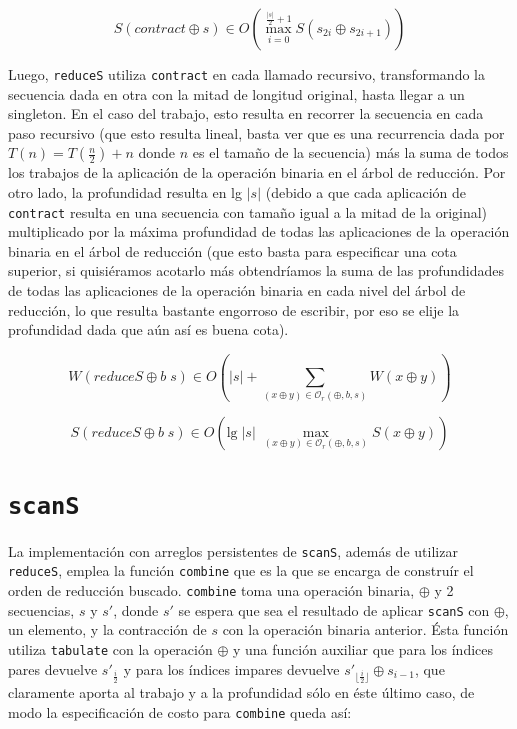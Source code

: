 \documentclass[a4paper,10pt]{article}
\begin{document}
\begin{equation*}
    S \left( contract \oplus s \right) \in
    O \left( \max_{i=0}^{\frac{\vert s \vert}{2} + 1} S \left( s_{2i} \oplus s_{2i+1} \right) \right)
\end{equation*}

Luego, \texttt{reduceS} utiliza \texttt{contract} en cada llamado recursivo,
transformando la secuencia dada en otra con la mitad de longitud original, hasta
llegar a un singleton. En el caso del trabajo, esto resulta en recorrer la secuencia
en cada paso recursivo (que esto resulta lineal, basta ver que es una recurrencia
dada por $T \left( n \right) = T \left( \frac{n}{2} \right) + n$ donde $n$ es el
tamaño de la secuencia) más la suma de todos los trabajos de la aplicación de la
operación binaria en el árbol de reducción. Por otro lado, la profundidad resulta
en lg $\vert s \vert$ (debido a que cada aplicación de \texttt{contract} resulta
en una secuencia con tamaño igual a la mitad de la original) multiplicado por la
máxima profundidad de todas las aplicaciones de la operación binaria en el árbol
de reducción (que esto basta para especificar una cota superior, si quisiéramos
acotarlo más obtendríamos la suma de las profundidades de todas las aplicaciones
de la operación binaria en cada nivel del árbol de reducción, lo que resulta
bastante engorroso de escribir, por eso se elije la profundidad dada que aún así
es buena cota).

\begin{equation*}
    W \left( reduceS \oplus b \; s \right) \in
    O \left( \vert s \vert + \sum_{(x \oplus y) \in \mathcal{O}_r(\oplus,b,s)} W \left( x \oplus y \right) \right)
\end{equation*}

\begin{equation*}
    S \left( reduceS \oplus b \; s \right) \in
    O \left( \text{lg} \; \vert s \vert \; \max_{(x \oplus y) \in \mathcal{O}_r(\oplus,b,s)} S \left( x \oplus y \right) \right)
\end{equation*}

\section*{\texttt{scanS}}

La implementación con arreglos persistentes de \texttt{scanS}, además de utilizar
\texttt{reduceS}, emplea la función \texttt{combine} que es la que se encarga de
construír el orden de reducción buscado.
\texttt{combine} toma una operación binaria, $\oplus$ y 2 secuencias, $s$ y $s'$,
donde $s'$ se espera que sea el resultado de aplicar \texttt{scanS} con $\oplus$,
un elemento, y la contracción de $s$ con la operación binaria anterior. Ésta función
utiliza \texttt{tabulate} con la operación $\oplus$ y una función auxiliar que
para los índices pares devuelve $s'_{\frac{i}{2}}$ y para los índices impares
devuelve $s'_{\lfloor \frac{i}{2} \rfloor} \oplus s_{i-1}$, que claramente
aporta al trabajo y a la profundidad sólo en éste último caso, de modo la especificación
de costo para \texttt{combine} queda así: 
\end{document}
